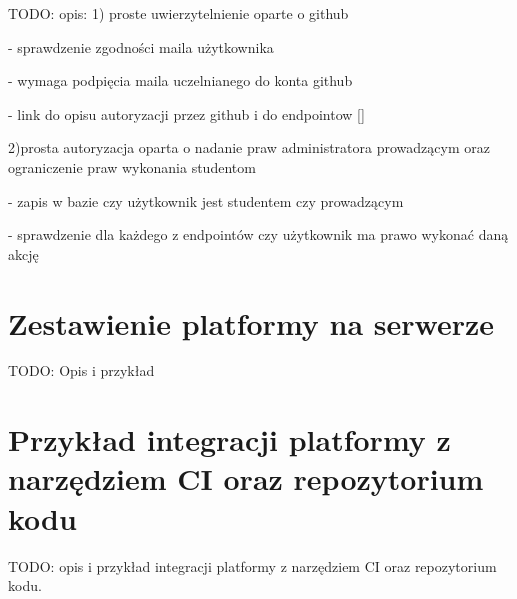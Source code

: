 TODO: opis:
1) proste uwierzytelnienie oparte o github

- sprawdzenie zgodności maila użytkownika

- wymaga podpięcia maila uczelnianego do konta github

- link do opisu autoryzacji przez github i do endpointow []

2)prosta autoryzacja oparta o nadanie praw administratora prowadzącym
oraz ograniczenie praw wykonania studentom

- zapis w bazie czy użytkownik jest studentem czy prowadzącym

- sprawdzenie dla każdego z endpointów czy użytkownik ma prawo wykonać daną akcję

\section {Zestawienie platformy na serwerze}
\label{run-platform}

TODO: Opis i przykład

\section {Przykład integracji platformy z narzędziem CI oraz repozytorium kodu}
\label{ci-integration}

TODO: opis i przykład integracji platformy z narzędziem CI oraz repozytorium
kodu.